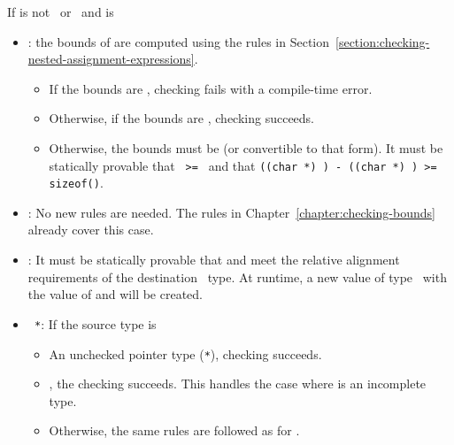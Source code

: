 If  is not \ptrvoid\ or \uncheckedptrvoid\ and  is
\begin{itemize}
\item \ptrT: the bounds of  are computed using the rules
in Section~\ref{section:checking-nested-assignment-expressions}.
\begin{itemize}
\item If the bounds are \boundsnone, checking fails with a compile-time
error.
\item Otherwise, if the bounds are \boundsany, checking 
succeeds.
\item Otherwise, the bounds must be  (or convertible
to that form).  It must be statically provable that \texttt{ >= }
and that {\texttt{((char *) ) - ((char *) ) >= sizeof()}}.    
\end{itemize}
\item \arrayptrT: No new rules are needed.   The rules in
Chapter~\ref{chapter:checking-bounds} already cover this case.
\item \spanptrT: It must be statically provable that 
and  meet the relative alignment requirements of
the destination \spanptr\ type.  At runtime, a new value of
type \spanptrT\ with the value of  and  will be created.
\item \texttt{ *}: If the source type  is
\begin{itemize}
\item An unchecked pointer type (\texttt{*}), checking succeeds.
\item \ptrT, the checking succeeds. This handles the case where 
is an incomplete type.
\item Otherwise, the same rules are followed as for \ptrT.
\end{itemize}
\end{itemize}

